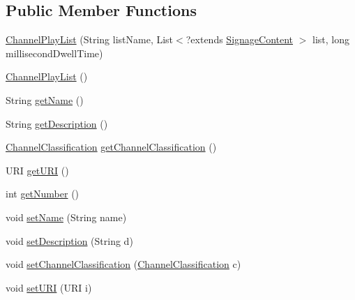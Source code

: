 \subsection*{Public Member Functions}
\begin{DoxyCompactItemize}
\item 
\hyperlink{classgov_1_1fnal_1_1ppd_1_1dd_1_1channel_1_1ChannelPlayList_a9235b6c790a7ee1587b5a3ae04afc8e9}{Channel\-Play\-List} (String list\-Name, List$<$?extends \hyperlink{interfacegov_1_1fnal_1_1ppd_1_1dd_1_1signage_1_1SignageContent}{Signage\-Content} $>$ list, long millisecond\-Dwell\-Time)
\item 
\hyperlink{classgov_1_1fnal_1_1ppd_1_1dd_1_1channel_1_1ChannelPlayList_af6a62dd284fed342597292000aece6c3}{Channel\-Play\-List} ()
\item 
String \hyperlink{classgov_1_1fnal_1_1ppd_1_1dd_1_1channel_1_1ChannelPlayList_a1c2d3e0fcb9cee5cad06dc3d7bdb96e9}{get\-Name} ()
\item 
String \hyperlink{classgov_1_1fnal_1_1ppd_1_1dd_1_1channel_1_1ChannelPlayList_a1b1c73554407ef5d5f8f7f3b239a1f12}{get\-Description} ()
\item 
\hyperlink{classgov_1_1fnal_1_1ppd_1_1dd_1_1changer_1_1ChannelClassification}{Channel\-Classification} \hyperlink{classgov_1_1fnal_1_1ppd_1_1dd_1_1channel_1_1ChannelPlayList_a8e1ce06c00064455483d664b4d0fef17}{get\-Channel\-Classification} ()
\item 
U\-R\-I \hyperlink{classgov_1_1fnal_1_1ppd_1_1dd_1_1channel_1_1ChannelPlayList_a6f2e7a1655fb99a2e711c225912d2d79}{get\-U\-R\-I} ()
\item 
int \hyperlink{classgov_1_1fnal_1_1ppd_1_1dd_1_1channel_1_1ChannelPlayList_a70afc652012758cd493013f94ef22efa}{get\-Number} ()
\item 
void \hyperlink{classgov_1_1fnal_1_1ppd_1_1dd_1_1channel_1_1ChannelPlayList_add9a4e4bdd0370b68ed3190ba1677070}{set\-Name} (String name)
\item 
void \hyperlink{classgov_1_1fnal_1_1ppd_1_1dd_1_1channel_1_1ChannelPlayList_a1321936810234139f911c5a1c7d6a7af}{set\-Description} (String d)
\item 
void \hyperlink{classgov_1_1fnal_1_1ppd_1_1dd_1_1channel_1_1ChannelPlayList_a145fde3f59f8025e8c79117024d5d3ab}{set\-Channel\-Classification} (\hyperlink{classgov_1_1fnal_1_1ppd_1_1dd_1_1changer_1_1ChannelClassification}{Channel\-Classification} c)
\item 
void \hyperlink{classgov_1_1fnal_1_1ppd_1_1dd_1_1channel_1_1ChannelPlayList_a7bb16de560ccbd745ee6a4f12e7756ae}{set\-U\-R\-I} (U\-R\-I i)

\end{DoxyCompactItemize}
